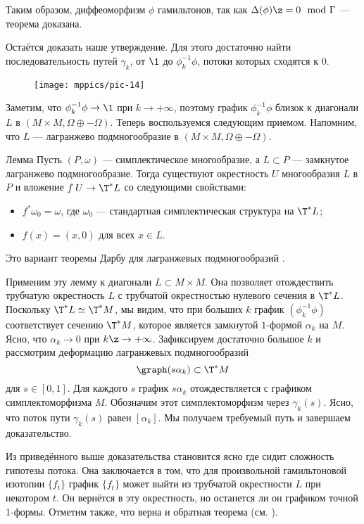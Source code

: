 Таким образом, диффеоморфизм $\phi$ гамильтонов, так как $\Delta(\phi) \z= 0 \mod{\Gamma}$  --- теорема доказана.

Остаётся доказать наше утверждение.
Для этого достаточно найти последовательность путей $\gamma_k$, от $\1$ до $\phi_k^{-1}\phi$, потоки которых сходятся к $0$.

\begin{figure}[ht!]
\centering
\texttt{[image: mppics/pic-14]}
\caption{}\label{pic-14}
\vskip0mm
\end{figure}

Заметим, что $\phi_k^{-1}\phi \to \1$ при $k \to +\infty$, поэтому график $\phi_k^{-1}\phi$ близок к диагонали $L$ в $(M \times M, \Omega \oplus -\Omega)$.
Теперь воспользуемся следующим приемом.
Напомним, что $L$ --- лагранжево подмногообразие в $(M \times M, \Omega \oplus -\Omega)$.

\begin{thm}{Лемма}
Пусть $(P, \omega)$ --- симплектическое многообразие, а $L\subset P$ --- замкнутое лагранжево подмногообразие.
Тогда существуют окрестность $U$ многообразия $L$ в $P$ и вложение $f\: U \to \T^\ast L$ со следующими свойствами:
\begin{itemize}
\item $f^\ast\omega_0 = \omega$, где $\omega_0$ --- стандартная симплектическая структура на $\T^\ast L$;
\item $f(x) = (x,0)$ для всех $x\in L$.
\end{itemize}
\end{thm}
Это вариант теоремы Дарбу для лагранжевых подмногообразий \cite{MS}.

Применим эту лемму к диагонали $L \subset M \times M$.
Она позволяет отождествить трубчатую окрестность $L$ с трубчатой ​​окрестностью нулевого сечения в $\T^\ast L$.
Поскольку $\T^\ast L \simeq \T^\ast M$, мы видим, что при больших $k$ график $(\phi_k^{-1}\phi)$ соответствует сечению $\T^\ast M$, которое является замкнутой $1$-формой $\alpha_k$ на $M$.
Ясно, что $\alpha_k \to 0$ при $k\z\to +\infty$.
Зафиксируем достаточно большое $k$ и рассмотрим деформацию лагранжевых подмногообразий 
\[\graph (s\alpha_k) \subset \T^\ast M\]
для $s \in [0,1]$.
Для каждого $s$ график $s\alpha_k$ отождествляется с графиком симплектоморфизма $M$.
Обозначим этот симплектоморфизм через $\gamma_k(s)$.
Ясно, что поток пути $\gamma_k(s)$ равен $[\alpha_k]$.
Мы получаем требуемый путь и завершаем доказательство.
\qeds

Из приведённого выше доказательства становится ясно где сидит сложность гипотезы потока.
Она заключается в том, что для произвольной гамильтоновой изотопии $\{f_t\}$ график $\{f_t\}$ может выйти из трубчатой ​​окрестности $L$ при некотором $t$.
Он вернётся в эту окрестность, но останется ли он графиком точной 1-формы.
Отметим также, что верна и обратная теорема (см. \cite{LMP1}).

